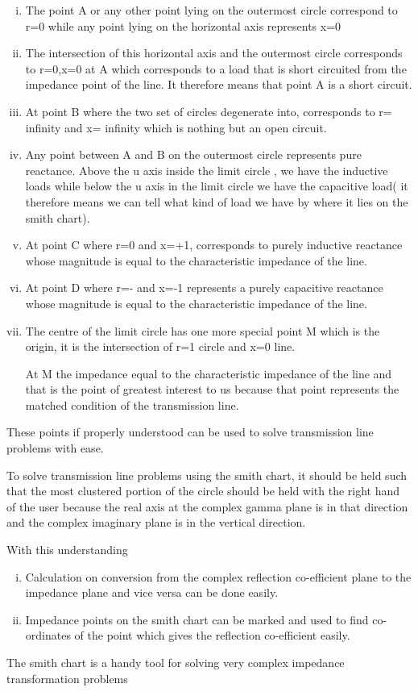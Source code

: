 \begin{enumerate}[(i)]
\item The point A or any other point lying on the outermost circle correspond to r=0 while any point lying on the horizontal axis represents x=0
\item The intersection of this horizontal axis and the outermost circle corresponds to r=0,x=0 at A which corresponds to a load that is short circuited from the impedance point of the line. It therefore means that point A is a short circuit.
\item At point B where the two set of circles degenerate into, corresponds to r= infinity and x= infinity which is nothing but an open circuit.\item Any point between A and B on the outermost circle represents pure reactance. Above the u axis inside the limit circle , we have the inductive loads while below the u axis in the limit circle we have the capacitive load( it therefore means we can tell what kind of load we have by where it lies on the smith chart).
\item At point C where r=0 and x=+1, corresponds to purely inductive reactance whose magnitude is equal to the characteristic impedance of the line.
\item At point D where r=- and x=-1 represents a purely capacitive reactance whose magnitude is equal to the characteristic impedance of the line.
\item The centre of the limit circle has one more special point M which is the origin, it is the intersection of r=1 circle and x=0 line.

At M the impedance equal to the characteristic impedance of the line and that is the point of greatest interest to us because that point represents the matched condition of the transmission line.
\end{enumerate}
These points if properly understood can be used to solve transmission line problems with ease.

To solve transmission line problems using the smith chart, it should be held such that the most clustered portion of the circle should be held with the right hand of the user because the real axis at the complex gamma plane is in that direction and the complex imaginary plane is in the vertical direction.

With this understanding
\begin{enumerate}[(i)]
\item Calculation on conversion from the complex reflection co-efficient plane to the impedance plane and vice versa can be done easily.
\item Impedance points on the smith chart can be marked and used to find co-ordinates of the point which gives the reflection co-efficient easily.
\end{enumerate}
The smith chart is a handy tool for solving very complex impedance transformation problems

